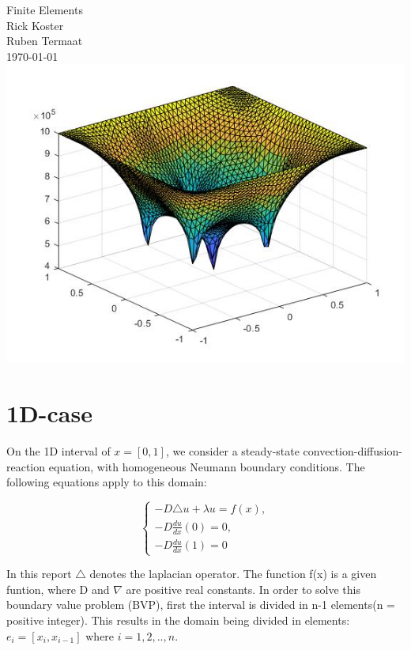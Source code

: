 \documentclass[a4paper]{report}
\begin{document}
	
\begin{titlepage}

		\centering
		\vspace*{5\baselineskip}
		\Huge
		Finite Elements
		\\[2\baselineskip]
		\normalsize
		Rick Koster\\
		Ruben Termaat\\
		\today
		\vfill
		\includegraphics[width=15cm]{3Dv.jpg}
		\vfill
	
\end{titlepage}
	
\clearpage\mbox{}\clearpage

\tableofcontents


\chapter{1D-case}



On the 1D interval of $x = [0,1]  $, we consider a steady-state convection-diffusion-reaction equation, with homogeneous Neumann boundary conditions. The following equations apply to this domain:

\begin{equation}
\begin{cases} 
-D\triangle u + \lambda u = f(x),\\ -D\frac{du}{dx}(0) = 0 ,\\ -D\frac{du}{dx}(1) = 0
\end{cases} 
\end{equation}
\bigskip

In this report $\triangle$ denotes the laplacian operator. The function f(x) is a given funtion, where D and $\nabla$ are positive real constants. In order to solve this boundary value problem (BVP), first the interval is divided in n-1 elements(n = positive integer). This results in the domain being divided in elements: $e_i = [x_i, x_{i-1}]$ where $i={1,2,..,n}$. 
\end{document}
